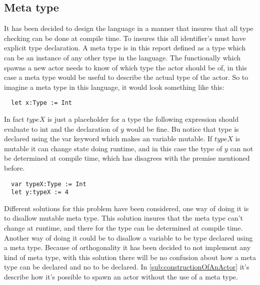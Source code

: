 \subsection{Meta type}
\label{sub:meta_type}

It has been decided to design the language in a manner that insures that all type checking can be done at compile time. To insures this all identifier's must have explicit type declaration. A meta type is in this report defined as a type which can be an instance of any other type in the language.  The functionally which spawns a new actor needs to know of which type the actor should be of, in this case a meta type would be useful to describe the actual type of the actor.
So to imagine a meta type in this language, it would look something like this:

\begin{verbatim}
  let x:Type := Int
\end{verbatim}
In fact $typeX$ is just a placeholder for a type the following expression should evaluate to int and the declaration of $y$ would be fine. Bu notice that type is declared using the var keyword which makes an variable mutable. If $typeX$ is mutable it can change state doing runtime, and in this case the type of $y$ can not be determined at compile time, which has disagrees with the premise mentioned before. 

\begin{verbatim}
  var typeX:Type := Int
  let y:typeX := 4
\end{verbatim}
Different solutions for this problem have been considered, one way of doing it is to disallow mutable meta type. This solution insures that the meta type can't change at runtime, and there for the type can be determined at compile time. Another way of doing it could be to disallow a variable to be type declared using a meta type. Because of orthogonality it has been decided to not implement any kind of meta type, with this solution there will be no confusion about how a meta type can be declared and no to be declared. 
In \cref{sub:constructionOfAnActor} it's describe how it's possible to spawn an actor without the use of a meta type.
